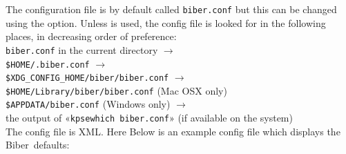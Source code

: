 \documentclass{ltxdockit}
\newcommand*{\biber}{Biber\xspace}
\begin{document}
The configuration file is by default called \verb+biber.conf+ but this can
be changed using the  option. Unless
 is used, the config file is
looked for in the following places, in decreasing order of preference:\\[2ex]

\noindent \verb+biber.conf+ in the current directory $\rightarrow$\\
\hspace*{1em}\verb+$HOME/.biber.conf+ $\rightarrow$\\
\hspace*{2em}\verb+$XDG_CONFIG_HOME/biber/biber.conf+ $\rightarrow$\\
\hspace*{3em}\verb+$HOME/Library/biber/biber.conf+ (Mac OSX only)\\
\hspace*{3em}\verb+$APPDATA/biber.conf+ (Windows only) $\rightarrow$\\
\hspace*{4em}the output of «\verb+kpsewhich biber.conf+» (if available on the
system)\\[2ex]

\noindent The config file is XML. Here Below is
an example config file which displays the \biber\ defaults:
\end{document}
